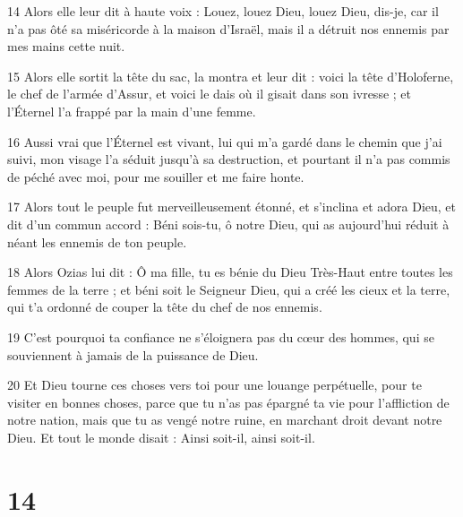 \par 14 Alors elle leur dit à haute voix : Louez, louez Dieu, louez Dieu, dis-je, car il n'a pas ôté sa miséricorde à la maison d'Israël, mais il a détruit nos ennemis par mes mains cette nuit.
\par 15 Alors elle sortit la tête du sac, la montra et leur dit : voici la tête d'Holoferne, le chef de l'armée d'Assur, et voici le dais où il gisait dans son ivresse ; et l'Éternel l'a frappé par la main d'une femme.
\par 16 Aussi vrai que l'Éternel est vivant, lui qui m'a gardé dans le chemin que j'ai suivi, mon visage l'a séduit jusqu'à sa destruction, et pourtant il n'a pas commis de péché avec moi, pour me souiller et me faire honte.
\par 17 Alors tout le peuple fut merveilleusement étonné, et s'inclina et adora Dieu, et dit d'un commun accord : Béni sois-tu, ô notre Dieu, qui as aujourd'hui réduit à néant les ennemis de ton peuple.
\par 18 Alors Ozias lui dit : Ô ma fille, tu es bénie du Dieu Très-Haut entre toutes les femmes de la terre ; et béni soit le Seigneur Dieu, qui a créé les cieux et la terre, qui t'a ordonné de couper la tête du chef de nos ennemis.
\par 19 C'est pourquoi ta confiance ne s'éloignera pas du cœur des hommes, qui se souviennent à jamais de la puissance de Dieu.
\par 20 Et Dieu tourne ces choses vers toi pour une louange perpétuelle, pour te visiter en bonnes choses, parce que tu n'as pas épargné ta vie pour l'affliction de notre nation, mais que tu as vengé notre ruine, en marchant droit devant notre Dieu. Et tout le monde disait : Ainsi soit-il, ainsi soit-il.

\chapter{14}

